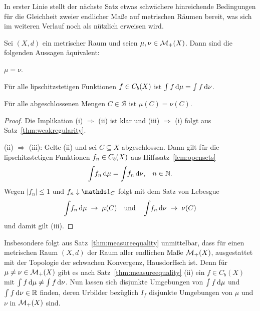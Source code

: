 \documentclass[../main/main.tex]{subfiles}
\begin{document}
	In erster Linie stellt der nächste Satz etwas schwächere hinreichende Bedingungen für die Gleichheit zweier endlicher Maße 
	auf metrischen Räumen bereit, was sich im weiteren Verlauf noch als nützlich erweisen wird.
	
	\begin{Satz}
		\label{thm:measureequality}
		Sei $(X,d)$ ein metrischer Raum und seien $\mu, \nu \in \mathcal{M}_{+}(X)$. 
		Dann sind die folgenden Aussagen äquivalent:
		\begin{equivalentthm}
			\item $\mu = \nu$.
			\item Für alle lipschitzstetigen Funktionen $f \in C_b(X)$ ist
			$\int_{} \, f \, \mathrm{d}\mu = \int_{} \, f \, \mathrm{d}\nu$.
			\item Für alle abgeschlossenen Mengen $C \in \mathcal{B}$ ist $\mu(C) = \nu(C)$.
		\end{equivalentthm}
	\end{Satz}
	
	\begin{proof}
		Die Implikation (i) $\Rightarrow$ (ii) ist klar und (iii) 
		$\Rightarrow$ (i) folgt aus Satz~\ref{thm:weakregularity}.
		
		(ii) $\Rightarrow$ (iii): Gelte (ii) und sei $C \subseteq X$ abgeschlossen. 
		Dann gilt für die lipschitzstetigen Funktionen $f_n \in C_b(X)$ aus Hilfssatz~\ref{lem:opensets}
		$$\int_{} \, f_n \, \mathrm{d}\mu = \int_{} \, f_n \, \mathrm{d}\nu\text{,} \quad n \in \mathbb{N} \text{.}$$
		Wegen $| f_n | \leq 1$ und $f_n \convdown \indfct_C$ folgt mit dem Satz von Lebesgue 
		$$\int_{} \, f_n \, \mathrm{d}\mu \; \to \; \mu(C) \quad \text{und} \quad \int_{} \, f_n \, \mathrm{d}\nu 
		\; \to \; \nu(C)$$
		und damit gilt (iii).
	\end{proof}

	\begin{Bemerkung}
		Insbesondere folgt aus Satz~\ref{thm:measureequality} unmittelbar, dass für einen metrischen Raum $(X, d)$ der Raum aller endlichen Maße $\mathcal{M}_{+}(X)$, ausgestattet mit der
		Topologie der schwachen Konvergenz, Hausdorffsch ist. Denn für $\mu \neq \nu \in \mathcal{M}_{+}(X)$ gibt es nach Satz~\ref{thm:measureequality} (ii) ein $f \in C_b(X)$
		mit $\int_{} \, f \, \mathrm{d}\mu \neq \int_{} \, f \, \mathrm{d}\nu$. Nun lassen sich disjunkte Umgebungen von $\int_{} \, f \, \mathrm{d}\mu$ und $\int_{} \, f \, \mathrm{d}\nu \in \mathbb{R}$ finden, deren Urbilder bezüglich 
		$I_f$ disjunkte Umgebungen von $\mu$ und $\nu$ in $\mathcal{M}_{+}(X)$ sind.
	\end{Bemerkung}
\end{document}
